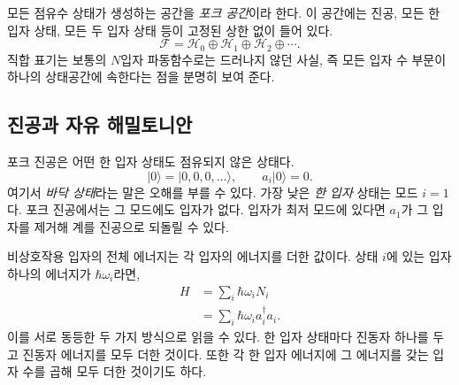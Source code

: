 모든 점유수 상태가 생성하는 공간을 \emph{포크 공간}이라 한다. 이 공간에는 진공, 모든 한 입자 상태, 모든 두 입자 상태 등이 고정된 상한 없이 들어 있다.
\begin{equation}
\mathcal F=\mathcal H_0\oplus\mathcal H_1\oplus\mathcal H_2\oplus\cdots.
\label{eq:l06-fock-space}
\end{equation}
직합 표기는 보통의 \(N\)입자 파동함수로는 드러나지 않던 사실, 즉 모든 입자 수 부문이 하나의 상태공간에 속한다는 점을 분명히 보여 준다.

\begin{classroomqa}\end{classroomqa}

\subsection{진공과 자유 해밀토니안}

포크 진공은 어떤 한 입자 상태도 점유되지 않은 상태다.
\begin{equation}
|0\rangle=|0,0,0,\ldots\rangle,
\qquad a_i|0\rangle=0.
\end{equation}
여기서 \emph{바닥 상태}라는 말은 오해를 부를 수 있다. 가장 낮은 \emph{한 입자} 상태는 모드 \(i=1\)다. 포크 진공에서는 그 모드에도 입자가 없다. 입자가 최저 모드에 있다면 \(a_1\)가 그 입자를 제거해 계를 진공으로 되돌릴 수 있다.

\begin{classroomqa}\end{classroomqa}

비상호작용 입자의 전체 에너지는 각 입자의 에너지를 더한 값이다. 상태 \(i\)에 있는 입자 하나의 에너지가 \(\hbar\omega_i\)라면,
\begin{align}
H
&=\sum_i \hbar\omega_i N_i \\
&=\sum_i \hbar\omega_i a_i^\dagger a_i.
\label{eq:l06-free-fock-hamiltonian}
\end{align}
이를 서로 동등한 두 가지 방식으로 읽을 수 있다. 한 입자 상태마다 진동자 하나를 두고 진동자 에너지를 모두 더한 것이다. 또한 각 한 입자 에너지에 그 에너지를 갖는 입자 수를 곱해 모두 더한 것이기도 하다.

